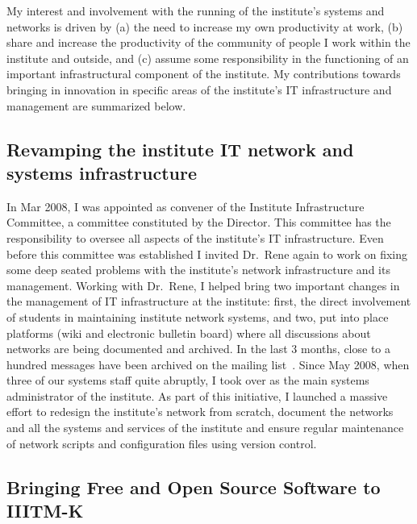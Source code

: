 \documentclass[titlepage, %
11pt, 
]{article}
\begin{document}
My interest and involvement with the running of the
institute's systems and networks is driven by (a) the need
to increase my own productivity at work, (b) share and
increase the productivity of the community of people I work
within the institute and outside, and (c) assume some
responsibility in the functioning of an important
infrastructural component of the institute.  My
contributions towards bringing in innovation in specific
areas of the institute's IT infrastructure and management
are summarized below.

\subsection{Revamping the institute IT network and systems infrastructure}
\label{subsec:network}

In Mar 2008, I was appointed as convener of the Institute
Infrastructure Committee, a committee constituted by the
Director.  This committee has the responsibility to oversee
all aspects of the institute's IT infrastructure.  Even
before this committee was established I invited Dr.~Rene
again to work on fixing some deep seated problems with the
institute's network infrastructure and its management.
Working with Dr.~Rene, I helped bring two important changes
in the management of IT infrastructure at the institute:
first, the direct involvement of students in maintaining
institute network systems, and two, put into place platforms
(wiki and electronic bulletin board) where all discussions
about networks are being documented and archived.  In the
last 3 months, close to a hundred messages have been
archived on the mailing
list~\cite{networks-iiitmk-mailing-list}.  Since May 2008,
when three of our systems staff quite abruptly, I took over
as the main systems administrator of the institute.  As part
of this initiative, I launched a massive effort to redesign
the institute's network from scratch, document the networks
and all the systems and services of the institute and ensure
regular maintenance of network scripts and configuration
files using version control.


\subsection{Bringing Free and Open Source Software to
  IIITM-K}
\label{subsec:foss}
\end{document}
